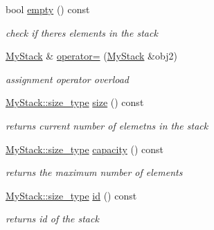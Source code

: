 \begin{DoxyCompactItemize}
bool \hyperlink{class_my_stack_a63f6a62fd6fa804501d564946512464b}{empty} () const
\begin{DoxyCompactList}\small\item\em check if there\textquotesingle{}s elements in the stack \end{DoxyCompactList}\item 
\mbox{\label{class_my_stack_ac936879fbafc66e63f1a2480ef8148e5}} 
\hyperlink{class_my_stack}{My\+Stack} \& \hyperlink{class_my_stack_ac936879fbafc66e63f1a2480ef8148e5}{operator=} (\hyperlink{class_my_stack}{My\+Stack} \&obj2)
\begin{DoxyCompactList}\small\item\em assignment operator overload \end{DoxyCompactList}\item 
\mbox{\label{class_my_stack_ae57edb4db436229444f42bf47bb89dbf}} 
\hyperlink{class_my_stack_a6e8ab1801eb1cf3b66928e0c0f2fe0fe}{My\+Stack\+::size\+\_\+type} \hyperlink{class_my_stack_ae57edb4db436229444f42bf47bb89dbf}{size} () const
\begin{DoxyCompactList}\small\item\em returns current number of elemetns in the stack \end{DoxyCompactList}\item 
\mbox{\label{class_my_stack_a3248e4407d1f6ba16402707ff9462966}} 
\hyperlink{class_my_stack_a6e8ab1801eb1cf3b66928e0c0f2fe0fe}{My\+Stack\+::size\+\_\+type} \hyperlink{class_my_stack_a3248e4407d1f6ba16402707ff9462966}{capacity} () const
\begin{DoxyCompactList}\small\item\em returns the maximum number of elements \end{DoxyCompactList}\item 
\mbox{\label{class_my_stack_ad123ddc9e35c047d461fa570a0acd346}} 
\hyperlink{class_my_stack_a6e8ab1801eb1cf3b66928e0c0f2fe0fe}{My\+Stack\+::size\+\_\+type} \hyperlink{class_my_stack_ad123ddc9e35c047d461fa570a0acd346}{id} () const
\begin{DoxyCompactList}\small\item\em returns id of the stack \end{DoxyCompactList}\end{DoxyCompactItemize}
